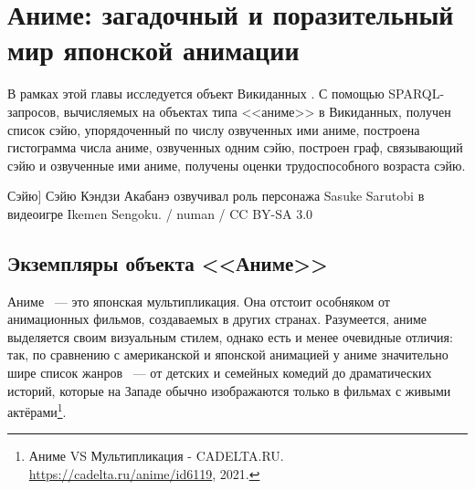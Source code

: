
\chapter{Аниме: загадочный и поразительный мир японской анимации}


В рамках этой главы исследуется объект Викиданных . С помощью SPARQL-запросов, вычисляемых на объектах типа <<аниме>> в Викиданных, получен список сэйю, упорядоченный по числу озвученных ими аниме, построена гистограмма числа аниме, озвученных одним сэйю, построен граф, связывающий сэйю и озвученные ими аниме, получены оценки трудоспособного возраста сэйю. 

\begin{marginfigure}[0.0cm]
{
	\setlength{\fboxsep}{0pt}%
	\setlength{\fboxrule}{1pt}%
}
\caption
[Сэйю]
{
Сэйю Кэндзи Акабанэ озвучивал роль персонажа Sasuke Sarutobi в видеоигре Ikemen Sengoku. / numan / CC BY-SA 3.0
}
\label{fig:seyu}
\end{marginfigure}

\label{ch:anime}

\section{Экземпляры объекта <<Аниме>>}

Аниме ~--- это японская мультипликация. Она отстоит особняком от анимационных фильмов, создаваемых в других странах. Разумеется, аниме выделяется своим визуальным стилем, однако есть и менее очевидные отличия: так, по сравнению с американской и японской анимацией у аниме значительно шире список жанров ~--- от детских и семейных комедий до драматических историй, которые на Западе обычно изображаются только в фильмах с живыми актёрами\footnote{Аниме VS Мультипликация - CADELTA.RU. \href{https://cadelta.ru/anime/id6119}{https://cadelta.ru/anime/id6119}, 2021.}.

